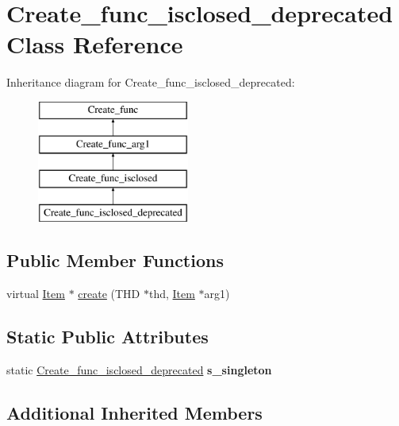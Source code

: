 \hypertarget{classCreate__func__isclosed__deprecated}{}\section{Create\+\_\+func\+\_\+isclosed\+\_\+deprecated Class Reference}
\label{classCreate__func__isclosed__deprecated}
Inheritance diagram for Create\+\_\+func\+\_\+isclosed\+\_\+deprecated\+:\begin{figure}[H]
\begin{center}
\leavevmode
\includegraphics[height=4.000000cm]{classCreate__func__isclosed__deprecated}
\end{center}
\end{figure}
\subsection*{Public Member Functions}
\begin{DoxyCompactItemize}
\item 
virtual \mbox{\hyperlink{classItem}{Item}} $\ast$ \mbox{\hyperlink{classCreate__func__isclosed__deprecated_a9db69e516a3c72b229cc4fe0660adad8}{create}} (T\+HD $\ast$thd, \mbox{\hyperlink{classItem}{Item}} $\ast$arg1)
\end{DoxyCompactItemize}
\subsection*{Static Public Attributes}
\begin{DoxyCompactItemize}
\item 
\mbox{\label{classCreate__func__isclosed__deprecated_a80fcb68b49c64008aa74e242b307259a}} 
static \mbox{\hyperlink{classCreate__func__isclosed__deprecated}{Create\+\_\+func\+\_\+isclosed\+\_\+deprecated}} {\bfseries s\+\_\+singleton}
\end{DoxyCompactItemize}
\subsection*{Additional Inherited Members}


